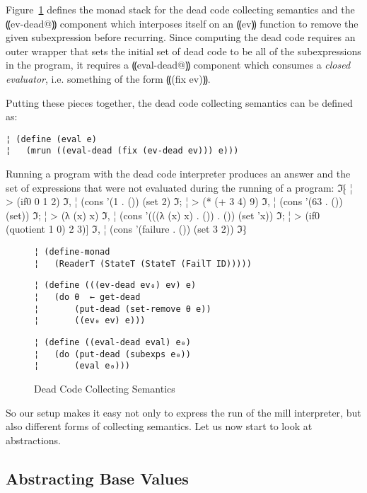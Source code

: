 Figure~\ref{f:dead} defines the monad stack for the dead code collecting
semantics and the ⸨ev-dead@⸩ component which interposes itself on an ⸨ev⸩
function to remove the given subexpression before recurring.  Since computing
the dead code requires an outer wrapper that sets the initial set of dead code
to be all of the subexpressions in the program, it requires a ⸨eval-dead@⸩
component which consumes a \emph{closed evaluator}, i.e. something of the form
⸨(fix ev)⸩.

Putting these pieces together, the dead code collecting semantics can be
defined as:
\begin{lstlisting}
¦ (define (eval e)
¦   (mrun ((eval-dead (fix (ev-dead ev))) e)))
\end{lstlisting}

Running a program with the dead code interpreter produces an answer
and the set of expressions that were not evaluated during the running
of a program:
ℑ⁅
¦ > (if0 0 1 2)
ℑ,
¦ (cons '(1 . ()) (set 2)
ℑ;
¦ > (* (+ 3 4) 9)
ℑ,
¦ (cons '(63 . ()) (set))
ℑ;
¦ > (λ (x) x)
ℑ,
¦ (cons '(((λ (x) x) . ()) . ()) (set 'x))
ℑ;
¦ > (if0 (quotient 1 0) 2 3)]
ℑ,
¦ (cons '(failure . ()) (set 3 2))
ℑ⁆

\begin{figure}
\begin{lstlisting}
¦ (define-monad
¦   (ReaderT (StateT (StateT (FailT ID)))))
\end{lstlisting}
\figskip{}
\begin{lstlisting}
¦ (define (((ev-dead ev₀) ev) e)
¦   (do θ  ← get-dead       
¦       (put-dead (set-remove θ e))
¦       ((ev₀ ev) e)))
\end{lstlisting}
\figskip{}
\begin{lstlisting}
¦ (define ((eval-dead eval) e₀)
¦   (do (put-dead (subexps e₀))
¦       (eval e₀)))
\end{lstlisting}
\caption{Dead Code Collecting Semantics}
\label{f:dead}
\end{figure}

So our setup makes it easy not only to express the run of the mill
interpreter, but also different forms of collecting semantics.
Let us now start to look at abstractions.

\subsection{Abstracting Base Values}\label{s:base}


